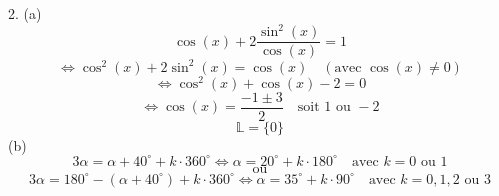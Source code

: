 \documentclass{article}
\begin{document}
2.
(a)
\[ \cos(x) + 2 \frac{\sin^2(x)}{\cos(x)} = 1 \]
\[ \Leftrightarrow \cos^2(x) + 2 \sin^2(x) = \cos(x) \quad (\text{avec } \cos(x) \ne 0) \]
\[ \Leftrightarrow \cos^2(x) + \cos(x) - 2 = 0 \]
\[ \Leftrightarrow \cos(x) = \frac{-1 \pm 3}{2} \quad \text{soit } 1 \text{ ou } -2 \]
\[ \mathbb{L} = \{0\} \]
(b)
\[ 3\alpha = \alpha + 40^\circ + k \cdot 360^\circ \Leftrightarrow \alpha = 20^\circ + k \cdot 180^\circ \quad \text{avec } k = 0 \text{ ou } 1 \]
\[ \text{ou} \]
\[ 3\alpha = 180^\circ - (\alpha + 40^\circ) + k \cdot 360^\circ \Leftrightarrow \alpha = 35^\circ + k \cdot 90^\circ \quad \text{avec } k = 0, 1, 2 \text{ ou } 3 \]
\end{document}
